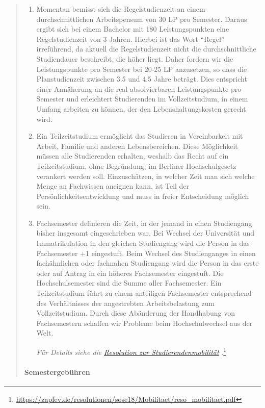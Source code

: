 \documentclass[DIV=14]{scrartcl}
\begin{document}
\begin{quote}
\begin{enumerate}
\item Momentan bemisst sich die Regelstudienzeit an einem durchschnittlichen Arbeitspensum von 30 LP pro Semester. Daraus ergibt sich bei einem Bachelor mit 180 Leistungspunkten eine Regelstudienzeit von 3 Jahren. Hierbei ist das Wort \enquote{Regel} irreführend, da aktuell die Regelstudienzeit nicht die durchschnittliche Studiendauer beschreibt, die höher liegt. Daher fordern wir die Leistungspunkte pro Semester bei 20-25 LP anzusetzen, so dass die Planstudienzeit zwischen 3.5 und 4.5 Jahre beträgt. Dies entspricht einer Annäherung an die real absolvierbaren Leistungspunkte pro Semester und erleichtert Studierenden im Vollzeitstudium, in einem Umfang arbeiten zu können, der den Lebenshaltungskosten gerecht wird.

\item Ein Teilzeitstudium ermöglicht das Studieren in Vereinbarkeit mit Arbeit, Familie und anderen Lebensbereichen. Diese Möglichkeit müssen alle Studierenden erhalten, weshalb das Recht auf ein Teilzeitstudium, ohne Begründung, im Berliner Hochschulgesetz verankert werden soll. Einzuschätzen, in welcher Zeit man sich welche Menge an Fachwissen aneignen kann, ist Teil der Persönlichkeitsentwicklung und muss in freier Entscheidung möglich sein.

\item Fachsemester definieren die Zeit, in der jemand in einen Studiengang bisher insgesamt eingeschrieben war. Bei Wechsel der Universität und Immatrikulation in den gleichen Studiengang wird die Person in das Fachsemester +1 eingestuft. Beim Wechsel des Studienganges in einen fachähnlichen oder fachnahen Studiengang wird die Person in das erste oder auf Antrag in ein höheres Fachsemester eingestuft. Die Hochschulsemester sind die Summe aller Fachsemester. Ein Teilzeitstudium führt zu einem anteiligen Fachsemester entsprechend des Verhältnisses der angestrebten Arbeitsbelastung zum Vollzeitstudium. Durch diese Abänderung der Handhabung von Fachsemestern schaffen wir Probleme beim Hochschulwechsel aus der Welt.

  \emph{Für Details siehe die
    }\href{https://zapfev.de/resolutionen/sose18/Mobilitaet/reso_mobilitaet.pdf}{\emph{Resolution zur Studierendenmobilität}}%
.\footnote{\url{https://zapfev.de/resolutionen/sose18/Mobilitaet/reso_mobilitaet.pdf}}
  \end{enumerate}

\hypertarget{semestergebuxfchren}{%
\paragraph{Semestergebühren}\label{semestergebuxfchren}}


\end{quote}
\end{document}
